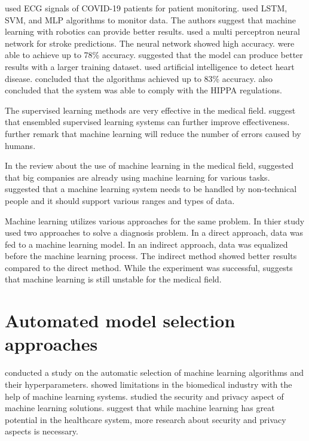 \cite{ref_paper_40} used ECG signals of COVID-19 patients for patient monitoring. \cite{ref_paper_40} used LSTM, SVM, and MLP algorithms to monitor data. The authors suggest that machine learning with robotics can provide better results.
\cite{ref_paper_42} used a multi perceptron neural network for stroke predictions. The neural network showed high accuracy. \cite{ref_paper_42} were able to achieve up to 78\% accuracy. \cite{ref_paper_42} suggested that the model can produce better results with a larger training dataset. \cite{ref_paper_41} used artificial intelligence to detect heart disease. \cite{ref_paper_41} concluded that the algorithms achieved up to 83\% accuracy. \cite{ref_paper_41} also concluded that the system was able to comply with the HIPPA regulations.

The supervised learning methods are very effective in the medical field. \cite{ref_paper_11} suggest that ensembled supervised learning systems can further improve effectiveness. \cite{ref_paper_11} further remark that machine learning will reduce the number of errors caused by humans.

In the review about the use of machine learning in the medical field, \cite{ref_paper_33} suggested that big companies are already using machine learning for various tasks. \cite{ref_paper_33} suggested that a machine learning system needs to be handled by non-technical people and it should support various ranges and types of data.

Machine learning utilizes various approaches for the same problem. In thier study \cite{ref_paper_8} used two approaches to solve a diagnosis problem. In a direct approach, data was fed to a machine learning model. In an indirect approach, data was equalized before the machine learning process. The indirect method showed better results compared to the direct method. While the experiment was successful, \cite{ref_paper_8} suggests that machine learning is still unstable for the medical field.

\section{Automated model selection approaches} \label{sec:automated_model_selection_approaches}

\cite{ref_paper_32} conducted a study on the automatic selection of machine learning algorithms and their hyperparameters. \cite{ref_paper_32} showed limitations in the biomedical industry with the help of machine learning systems. \cite{ref_paper_37} studied the security and privacy aspect of machine learning solutions. \cite{ref_paper_37} suggest that while machine learning has great potential in the healthcare system, more research about security and privacy aspects is necessary.

